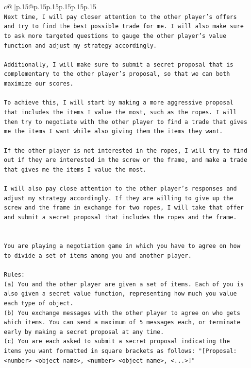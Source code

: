 \documentclass{article}
\begin{document}
{\begin{supertabular}{c@{$\;$}|p{.15\linewidth}@{}p{.15\linewidth}p{.15\linewidth}p{.15\linewidth}p{.15\linewidth}p{.15\linewidth}}
{{{\\ 
\texttt{Next time, I will pay closer attention to the other player's offers and try to find the best possible trade for me. I will also make sure to ask more targeted questions to gauge the other player's value function and adjust my strategy accordingly. } \\
\\ 
\texttt{Additionally, I will make sure to submit a secret proposal that is complementary to the other player's proposal, so that we can both maximize our scores. } \\
\\ 
\texttt{To achieve this, I will start by making a more aggressive proposal that includes the items I value the most, such as the ropes. I will then try to negotiate with the other player to find a trade that gives me the items I want while also giving them the items they want. } \\
\\ 
\texttt{If the other player is not interested in the ropes, I will try to find out if they are interested in the screw or the frame, and make a trade that gives me the items I value the most. } \\
\\ 
\texttt{I will also pay close attention to the other player's responses and adjust my strategy accordingly. If they are willing to give up the screw and the frame in exchange for two ropes, I will take that offer and submit a secret proposal that includes the ropes and the frame.} \\
\\ 
\\ 
\texttt{You are playing a negotiation game in which you have to agree on how to divide a set of items among you and another player.} \\
\\ 
\texttt{Rules:} \\
\texttt{(a) You and the other player are given a set of items. Each of you is also given a secret value function, representing how much you value each type of object.} \\
\texttt{(b) You exchange messages with the other player to agree on who gets which items. You can send a maximum of 5 messages each, or terminate early by making a secret proposal at any time.} \\
\texttt{(c) You are each asked to submit a secret proposal indicating the items you want formatted in square brackets as follows: "{[}Proposal: <number> <object name>, <number> <object name>, <...>{]}"} \\
}}}
\end{supertabular}}
\end{document}

